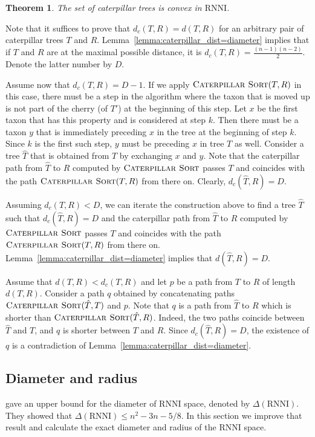 \documentclass{amsart}
\newcommand{\rnni}{\mathrm{RNNI}}
\newcommand{\csort}{\textsc{Caterpillar Sort}}
\newtheorem{theorem}{Theorem}
\begin{document}
\begin{theorem}
The set of caterpillar trees is convex in $\rnni$.
\label{thm:caterpillar_convex}
\end{theorem}

\proof
Note that it suffices to prove that $d_c(T, R) = d(T, R)$ for an arbitrary pair of caterpillar trees $T$ and $R$.
Lemma~\ref{lemma:caterpillar_dist=diameter} implies that if $T$ and $R$ are at the maximal possible distance, it is $d_c(T, R) = \frac{(n-1)(n-2)}{2}$.
Denote the latter number by $D$.

Assume now that $d_c(T, R) = D - 1$.
If we apply $\csort(T, R)$ in this case, there must be a step in the algorithm where the taxon that is moved up is not part of the cherry (of $T'$) at the beginning of this step.
Let $x$ be the first taxon that has this property and is considered at step $k$.
Then there must be a taxon $y$ that is immediately preceding $x$ in the tree at the beginning of step $k$.
Since $k$ is the first such step, $y$ must be preceding $x$ in tree $T$ as well.
Consider a tree $\hat T$ that is obtained from $T$ by exchanging $x$ and $y$.
Note that the caterpillar path from $\hat T$ to $R$ computed by $\csort$ passes $T$ and coincides with the path $\csort(T, R)$ from there on.
Clearly, $d_c(\hat T, R) = D$.

Assuming $d_c(T, R) < D$, we can iterate the construction above to find a tree $\hat T$ such that $d_c(\hat T, R) = D$ and the caterpillar path from $\hat T$ to $R$ computed by $\csort$ passes $T$ and coincides with the path $\csort(T, R)$ from there on.
Lemma~\ref{lemma:caterpillar_dist=diameter} implies that $d(\hat T, R) = D$.

Assume that $d(T, R) < d_c(T, R)$ and let $p$ be a path from $T$ to $R$ of length $d(T, R)$.
Consider a path $q$ obtained by concatenating paths $\csort(\hat T, T)$ and $p$.
Note that $q$ is a path from $\hat T$ to $R$ which is shorter than $\csort(\hat T, R)$.
Indeed, the two paths coincide between $\hat T$ and $T$, and $q$ is shorter between $T$ and $R$.
Since $d_c(\hat T, R) = D$, the existence of $q$ is a contradiction of Lemma~\ref{lemma:caterpillar_dist=diameter}.
\endproof


\subsection{Diameter and radius}
\label{section:diameter}

\textcite[Theorem~7]{Gavryushkin2018-ol} gave an upper bound for the diameter of $\rnni$ space, denoted by $\Delta(\rnni)$.
They showed that $\Delta(\rnni) \leq n^2 - 3n - 5/8$.
In this section we improve that result and calculate the exact diameter and radius of the $\rnni$ space.
\end{document}
